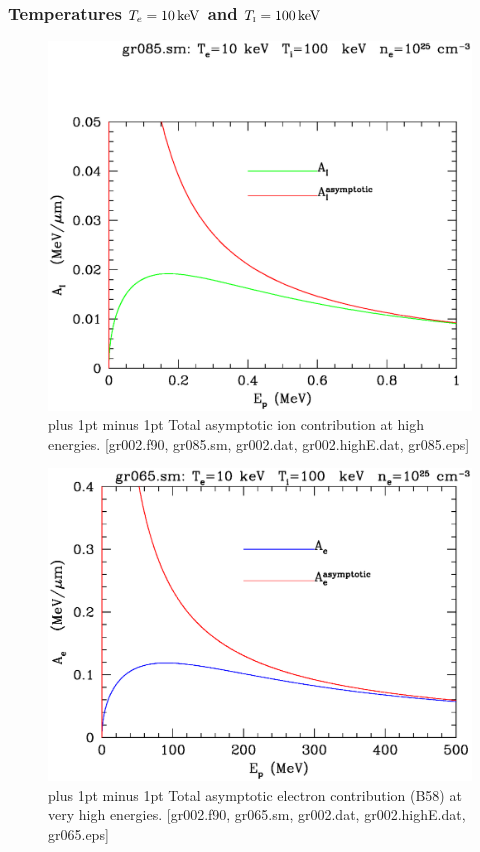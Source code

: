 \documentclass[preprint,12pt,eqsecnum,nofootinbib,amsmath,amssymb]{revtex4}
\newcommand{\smI}{{\rm\scriptscriptstyle I}}
\newcommand{\footnoteskip}{\baselineskip 12pt plus 1pt minus 1pt}
\begin{document}
\vfill

\pagebreak
\subsubsection{Temperatures $T_e=10\,{\rm keV}$ and $T_\smI=100\,{\rm keV}$}

\vskip-2cm 
\begin{figure}[h!]
\includegraphics[scale=0.45]{gr085.eps} 
\vskip-0.8cm 
\caption{\footnoteskip  
  Total asymptotic ion contribution at high energies. [gr002.f90,
  gr085.sm, gr002.dat, gr002.highE.dat, gr085.eps] 
}
\label{fig:gr085}
\end{figure}


\vskip-2cm 
\begin{figure}[h!]
\includegraphics[scale=0.45]{gr065.eps}
\vskip-0.8cm 
\caption{\footnoteskip  
  Total asymptotic electron contribution (B58) at very high
  energies. [gr002.f90, gr065.sm, gr002.dat, gr002.highE.dat, gr065.eps] 
}
\label{fig:gr065}
\end{figure}
\end{document}
